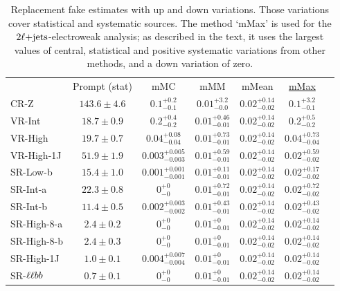 \begin{table}[tp]
\centering
\begin{tabular}{lcccccc}
& Prompt (stat)
& mMC
& mMM
& mMean
& \quad\underline{mMax}\hphantom{foo}
\\[0.5em]
CR-Z & $143.6 \pm 4.6$
& $0.1^{+0.2}_{-0.1}$
& $0.01^{+3.2}_{-0.0}$
& $0.02^{+0.14}_{-0.02}$
& $0.1^{+3.2}_{-0.1}$
\\[0.2em]
VR-Int & $18.7 \pm 0.9$
& $0.2^{+0.4}_{-0.2}$
& $0.01^{+0.46}_{-0.01}$
& $0.02^{+0.14}_{-0.02}$
& $0.2^{+0.5}_{-0.2}$
\\[0.2em]
VR-High & $19.7 \pm 0.7$
& $0.04^{+0.08}_{-0.04}$
& $0.01^{+0.73}_{-0.01}$
& $0.02^{+0.14}_{-0.02}$
& $0.04^{+0.73}_{-0.04}$
\\[0.2em]
VR-High-1J & $51.9 \pm 1.9$
& $0.003^{+0.005}_{-0.003}$
& $0.01^{+0.59}_{-0.01}$
& $0.02^{+0.14}_{-0.02}$
& $0.02^{+0.59}_{-0.02}$
\\[0.2em]
SR-Low-b & $15.4 \pm 1.0$
& $0.001^{+0.001}_{-0.001}$
& $0.01^{+0.11}_{-0.01}$
& $0.02^{+0.14}_{-0.02}$
& $0.02^{+0.17}_{-0.02}$
\\[0.2em]
SR-Int-a & $22.3 \pm 0.8$
& $0^{+0}_{-0}$
& $0.01^{+0.72}_{-0.01}$
& $0.02^{+0.14}_{-0.02}$
& $0.02^{+0.72}_{-0.02}$
\\[0.2em]
SR-Int-b & $11.4 \pm 0.5$
& $0.002^{+0.003}_{-0.002}$
& $0.01^{+0.43}_{-0.01}$
& $0.02^{+0.14}_{-0.02}$
& $0.02^{+0.43}_{-0.02}$
\\[0.2em]
SR-High-8-a & $2.4 \pm 0.2$
& $0^{+0}_{-0}$
& $0.01^{+0}_{-0.01}$
& $0.02^{+0.14}_{-0.02}$
& $0.02^{+0.14}_{-0.02}$
\\[0.2em]
SR-High-8-b & $2.4 \pm 0.3$
& $0^{+0}_{-0}$
& $0.01^{+0}_{-0.01}$
& $0.02^{+0.14}_{-0.02}$
& $0.02^{+0.14}_{-0.02}$
\\[0.2em]
SR-High-1J & $1.0 \pm 0.1$
& $0.004^{+0.007}_{-0.004}$
& $0.01^{+0}_{-0.01}$
& $0.02^{+0.14}_{-0.02}$
& $0.02^{+0.14}_{-0.02}$
\\[0.2em]
SR-$\ell\ell bb$ & $0.7 \pm 0.1$
& $0^{+0}_{-0}$
& $0.01^{+0}_{-0.01}$
& $0.02^{+0.14}_{-0.02}$
& $0.02^{+0.14}_{-0.02}$
\\
\end{tabular}
\caption[%
Replacement fake estimates with up and down variations
]{%
Replacement fake estimates with up and down variations.
Those variations cover statistical and systematic sources.
The method `mMax' is used for the $2\ell\mathrm{+jets}$-electroweak analysis;
as described in the text, it uses the largest values of central, statistical
and positive systematic variations from other methods, and a down variation
of zero.
}
\label{tab:2ljets_fnp_estimates}
\end{table}


